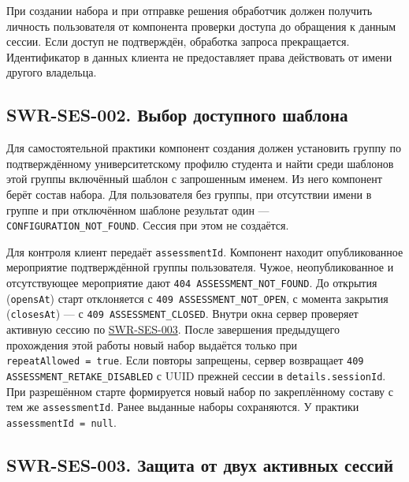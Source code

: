 \documentclass[12pt,a4paper]{article}
\begin{document}
\hypertarget{swr-ses-001-получение-пользователя}{}

\hypertarget{swr-ses-001}{}

При создании набора и при отправке решения обработчик должен получить личность пользователя от компонента проверки доступа до обращения к данным сессии. Если доступ не подтверждён, обработка запроса прекращается. Идентификатор в данных клиента не предоставляет права действовать от имени другого владельца.

\subsection{SWR-SES-002. Выбор доступного шаблона}\label{swr-ses-002-ux432ux44bux431ux43eux440-ux434ux43eux441ux442ux443ux43fux43dux43eux433ux43e-ux448ux430ux431ux43bux43eux43dux430}

\hypertarget{swr-ses-002-выбор-доступного-шаблона}{}

\hypertarget{swr-ses-002}{}

Для самостоятельной практики компонент создания должен установить группу по подтверждённому университетскому профилю студента и найти среди шаблонов этой группы включённый шаблон с запрошенным именем. Из него компонент берёт состав набора. Для пользователя без группы, при отсутствии имени в группе и при отключённом шаблоне результат один --- \texttt{CONFIGURATION\_\allowbreak{}NOT\_\allowbreak{}FOUND}. Сессия при этом не создаётся.

Для контроля клиент передаёт \texttt{assessmentId}. Компонент находит опубликованное мероприятие подтверждённой группы пользователя. Чужое, неопубликованное и отсутствующее мероприятие дают \texttt{404 ASSESSMENT\_\allowbreak{}NOT\_\allowbreak{}FOUND}. До открытия (\texttt{opensAt}) старт отклоняется с \texttt{409 ASSESSMENT\_\allowbreak{}NOT\_\allowbreak{}OPEN}, с момента закрытия (\texttt{closesAt}) --- с \texttt{409 ASSESSMENT\_\allowbreak{}CLOSED}. Внутри окна сервер проверяет активную сессию по {\hyperlink{swr-ses-003}{SWR-SES-003}}. После завершения предыдущего прохождения этой работы новый набор выдаётся только при \texttt{repeatAllowed\ =\ true}. Если повторы запрещены, сервер возвращает \texttt{409 ASSESSMENT\_\allowbreak{}RETAKE\_\allowbreak{}DISABLED} с UUID прежней сессии в \texttt{details.\allowbreak{}sessionId}. При разрешённом старте формируется новый набор по закреплённому составу с тем же \texttt{assessmentId}. Ранее выданные наборы сохраняются. У практики \texttt{assessmentId\ =\ null}.

\subsection{SWR-SES-003. Защита от двух активных сессий}\label{swr-ses-003-ux437ux430ux449ux438ux442ux430-ux43eux442-ux434ux432ux443ux445-ux430ux43aux442ux438ux432ux43dux44bux445-ux441ux435ux441ux441ux438ux439}
\end{document}
